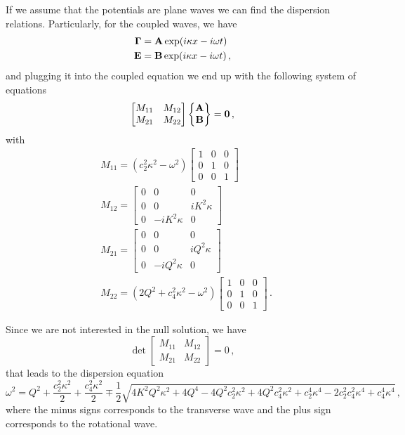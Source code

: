 \documentclass[12pt]{article}
\begin{document}
If we assume that the potentials are plane waves we can find the dispersion relations. Particularly, for the coupled waves, we have
\begin{align*}
\vb{\Gamma} &= \vb{A}\exp(i\kappa x - i\omega t)\\
\vb{E} &= \vb{B}\exp(i\kappa x - i\omega t)\, ,
\end{align*}
and plugging it into the coupled equation we end up with the following system of equations
\[\begin{bmatrix}
M_{11} &M_{12}\\
M_{21} &M_{22}\end{bmatrix}
\begin{Bmatrix} \vb{A}\\ \vb{B}\end{Bmatrix}
= \vb{0}\, ,\]
with
\begin{align*}
&M_{11} =
(c_{2}^{2} \kappa^{2} - \omega^{2})
\begin{bmatrix}
1 & 0 & 0\\
0 & 1 & 0 \\
0 & 0 & 1
\end{bmatrix}\\
&M_{12} =
\begin{bmatrix}
0 & 0 & 0\\
0 & 0 & i K^{2} \kappa\\
0 & -i K^{2} \kappa & 0
\end{bmatrix}\\
&M_{21} =
\begin{bmatrix}
0 & 0 & 0 \\
0 & 0 & i Q^{2} \kappa \\
0 & -i Q^{2} \kappa & 0 
\end{bmatrix}\\
&M_{22} =
(2 Q^{2} + c_{4}^{2} \kappa^{2} - \omega^{2})\begin{bmatrix}
1 &0 &0\\
0 &1 &0\\
0 &0 &1
\end{bmatrix}\, .
\end{align*}

Since we are not interested in the null solution, we have
\[\det\begin{bmatrix}
M_{11} &M_{12}\\
M_{21} &M_{22}\end{bmatrix}=0\, ,\]
that leads to the dispersion equation 
\begin{equation*}
\omega^2 = Q^{2} + \frac{c_{2}^{2} \kappa^{2}}{2} + \frac{c_{4}^{2} \kappa^{2}}{2} \mp \frac{1}{2} \sqrt{4 K^{2} Q^{2} \kappa^{2} + 4 Q^{4} - 4 Q^{2} c_{2}^{2} \kappa^{2} + 4 Q^{2} c_{4}^{2} \kappa^{2} + c_{2}^{4} \kappa^{4} - 2 c_{2}^{2} c_{4}^{2} \kappa^{4} + c_{4}^{4} \kappa^{4}}\, ,
\end{equation*}
where the minus signs corresponds to the transverse wave and the plus sign corresponds to the rotational wave.
\end{document}

